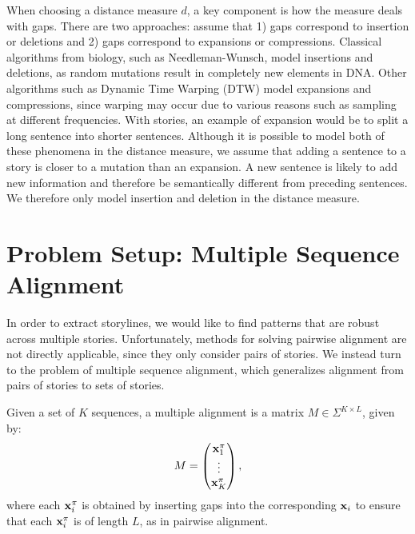 \documentclass{article}
\begin{document}
When choosing a distance measure $d$, a key component is how the measure deals with gaps.
There are two approaches: assume that 1) gaps correspond to insertion or deletions and 2) gaps
correspond to expansions or compressions.
Classical algorithms from biology, such as Needleman-Wunsch, model insertions and deletions,
as random mutations result in completely new elements in DNA.
Other algorithms such as Dynamic Time Warping (DTW) model expansions and compressions,
since warping may occur due to various reasons such as sampling at different frequencies.
With stories, an example of expansion would be to split a long sentence into
shorter sentences.
Although it is possible to model both of these phenomena in the distance measure,
we assume that adding a sentence to a story is closer to a mutation than an expansion.
A new sentence is likely to add new information and therefore be
semantically different from preceding sentences.
We therefore only model insertion and deletion in the distance measure.

\section{Problem Setup: Multiple Sequence Alignment}
In order to extract storylines, we would like to find patterns that are robust across
multiple stories. 
Unfortunately, methods for solving pairwise alignment are not directly applicable, since they
only consider pairs of stories.
We instead turn to the problem of multiple sequence alignment,
which generalizes alignment from pairs of stories to sets of stories.

Given a set of $K$ sequences,
a multiple alignment is a matrix $M \in \Sigma^{K \times L}$, given by:
\begin{equation}
M = \begin{pmatrix}
    \mathbf{x}_1^\pi \\
    \vdots \\
    \mathbf{x}_K^\pi
\end{pmatrix},
\end{equation}
where each $\mathbf{x}_i^\pi$ is obtained by inserting gaps into the corresponding $\mathbf{x}_i$
to ensure that each $\mathbf{x}_i^\pi$ is of length $L$, as in pairwise alignment.
\end{document}
